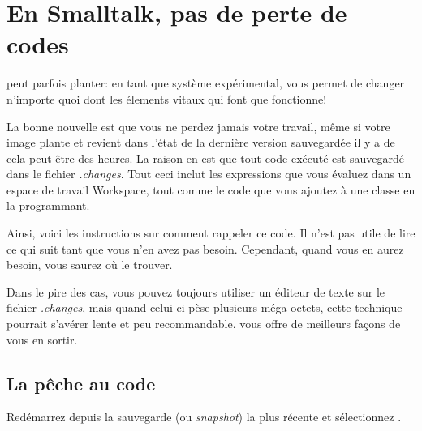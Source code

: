 \documentclass[a4paper,10pt,twoside]{book}
\begin{document}
\section{En Smalltalk, pas de perte de codes}

\pharo peut parfois planter: en tant que système expérimental, \pharo vous permet
de changer n'importe quoi dont les élements vitaux qui font que \pharo fonctionne!


La bonne nouvelle est que vous ne perdez jamais votre travail, même si votre 
image plante et revient dans l'état de la dernière version sauvegardée il y 
a de cela peut être des heures.
La raison en est que tout code exécuté est sauvegardé dans le fichier
\emph{.changes}.
Tout ceci inclut les expressions que vous évaluez dans un espace de travail Workspace,
tout comme le code que vous ajoutez à une classe en la programmant.

Ainsi, voici les instructions sur comment rappeler ce code.
Il n'est pas utile de lire ce qui suit tant que vous n'en avez pas besoin.
Cependant, quand vous en aurez besoin, vous saurez où le trouver.

Dans le pire des cas, vous pouvez toujours utiliser un éditeur de texte
sur le fichier \emph{.changes}, mais quand celui-ci pèse plusieurs méga-octets,
cette technique pourrait s'avérer lente et peu recommandable.
\pharo vous offre de meilleurs façons de vous en sortir.

\subsection{La pêche au code}

Redémarrez \pharo depuis la sauvegarde (ou \emph{snapshot}) la plus récente et
sélectionnez . 

\end{document}
